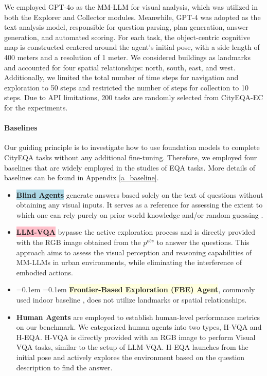 We employed GPT-4o as the MM-LLM for visual analysis, which was utilized in both the Explorer and Collector modules. Meanwhile, GPT-4 was adopted as the text analysis model, responsible for question parsing, plan generation, answer generation, and automated scoring. For each task, the object-centric cognitive map is constructed centered around the agent's initial pose, with a side length of 400 meters and a resolution of 1 meter. We considered buildings as landmarks and accounted for four spatial relationships: north, south, east, and west. Additionally, we limited the total number of time steps for navigation and exploration to 50 steps and restricted the number of steps for collection to 10 steps. Due to API limitations, 200 tasks are randomly selected from CityEQA-EC for the experiments.

\paragraph{Baselines}

Our guiding principle is to investigate how to use foundation models to complete CityEQA tasks without any additional fine-tuning. Therefore, we employed four baselines that are widely employed in the studies of EQA tasks. More details of baselines can be found in Appendix \ref{a_baseline}.
\vspace{-6pt}
\begin{itemize}[leftmargin=*]
    \item \textbf{\colorbox{LightBlue}{Blind Agents}} generate answers based solely on the text of questions without obtaining any visual inputs. It serves as a reference for assessing the extent to which one can rely purely on prior world knowledge and/or random guessing \cite{majumdar2024openeqa}.
    \vspace{-6pt}
    \item \textbf{\colorbox{pink}{LLM-VQA}} bypasse the active exploration process and is directly provided with the RGB image obtained from the ${p^{obs}}$ to answer the questions. This approach aims to assess the visual perception and reasoning capabilities of MM-LLMs in urban environments, while eliminating the interference of embodied actions.
    \vspace{-6pt}
    \item  
    {\spaceskip=0.1em \xspaceskip=0.1em \textbf{\colorbox{LightYellow}{Frontier-Based Exploration (FBE) Agent}}, commonly used indoor baseline \cite{ren2024explore}, does not utilize landmarks or spatial relationships.}
    
    \vspace{-6pt}
    \item \textbf{\colorbox{LightPurple}{Human Agents}} are employed to establish human-level performance metrics on our benchmark. We categorized human agents into two types, H-VQA and H-EQA.  H-VQA is directly provided with an RGB image to perform Visual VQA tasks, similar to the setup of LLM-VQA. H-EQA launches from the initial pose and actively explores the environment based on the question description to find the answer.

\end{itemize}


